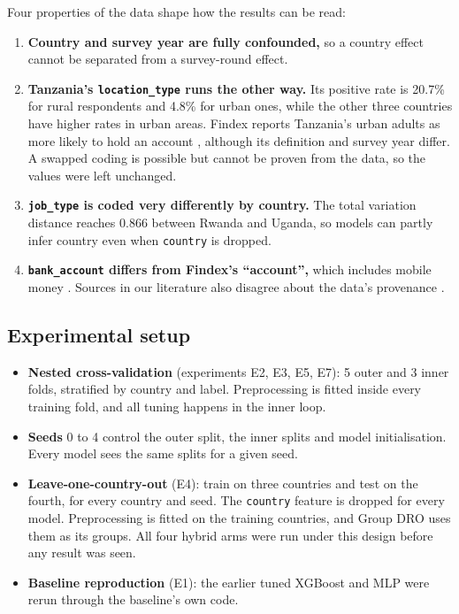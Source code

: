 \documentclass[11pt]{article}
\begin{document}
Four properties of the data shape how the results can be read:
\begin{enumerate}
  \item \textbf{Country and survey year are fully confounded,} so a country effect cannot be separated from a survey-round effect.
  \item \textbf{Tanzania's \texttt{location\_type} runs the other way.} Its positive rate is 20.7\% for rural respondents and 4.8\% for urban ones, while the other three countries have higher rates in urban areas. Findex reports Tanzania's urban adults as more likely to hold an account \citep[p.~47]{demirguckunt2022findex}, although its definition and survey year differ. A swapped coding is possible but cannot be proven from the data, so the values were left unchanged.
  \item \textbf{\texttt{job\_type} is coded very differently by country.} The total variation distance reaches 0.866 between Rwanda and Uganda, so models can partly infer country even when \texttt{country} is dropped.
  \item \textbf{\texttt{bank\_account} differs from Findex's ``account'',} which includes mobile money \citep[p.~33]{demirguckunt2022findex}. Sources in our literature also disagree about the data's provenance \citep{ismail2021using, balde2022efficient}.
\end{enumerate}

\subsection{Experimental setup}

\begin{itemize}
  \item \textbf{Nested cross-validation} (experiments E2, E3, E5, E7): 5 outer and 3 inner folds, stratified by country and label. Preprocessing is fitted inside every training fold, and all tuning happens in the inner loop.
  \item \textbf{Seeds} 0 to 4 control the outer split, the inner splits and model initialisation. Every model sees the same splits for a given seed.
  \item \textbf{Leave-one-country-out} (E4): train on three countries and test on the fourth, for every country and seed. The \texttt{country} feature is dropped for every model. Preprocessing is fitted on the training countries, and Group DRO uses them as its groups. All four hybrid arms were run under this design before any result was seen.
  \item \textbf{Baseline reproduction} (E1): the earlier tuned XGBoost and MLP were rerun through the baseline's own code.
\end{itemize}
\end{document}
